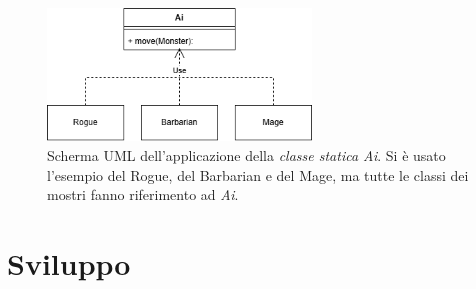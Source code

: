 \documentclass{report}
\begin{document}
\begin{figure}[H]
    \centering
    \includegraphics[width=7cm]{MonsterMovement.png}
    \caption{Scherma UML dell'applicazione della \textit{classe statica Ai}. Si è usato l'esempio del Rogue, del Barbarian e del Mage, ma tutte le classi dei mostri fanno riferimento ad \textit{Ai}.}
\end{figure}

\chapter{Sviluppo}
\end{document}

